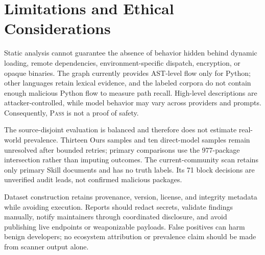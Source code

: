 \section{Limitations and Ethical Considerations}
\label{sec:limitations}

Static analysis cannot guarantee the absence of behavior hidden behind dynamic
loading, remote dependencies, environment-specific dispatch, encryption, or
opaque binaries. The graph currently provides AST-level flow only for Python;
other languages retain lexical evidence, and the labeled corpora do not contain
enough malicious Python flow to measure path recall. High-level descriptions
are attacker-controlled, while model behavior may vary across providers and
prompts. Consequently, \textsc{Pass} is not a proof of safety.

The source-disjoint evaluation is balanced and therefore does not estimate
real-world prevalence. Thirteen Ours samples and ten direct-model samples remain
unresolved after bounded retries; primary comparisons use the 977-package
intersection rather than imputing outcomes. The current-community scan retains
only primary Skill documents and has no truth labels. Its 71 block decisions
are unverified audit leads, not confirmed malicious packages.

Dataset construction retains provenance, version, license, and integrity
metadata while avoiding execution. Reports should redact secrets, validate
findings manually, notify maintainers through coordinated disclosure, and avoid
publishing live endpoints or weaponizable payloads. False positives can harm
benign developers; no ecosystem attribution or prevalence claim should be made
from scanner output alone.
